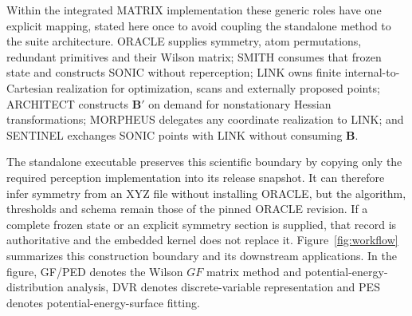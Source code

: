 \documentclass[journal=jctcce,manuscript=article,layout=traditional]{achemso}
\newcommand{\Bmat}{\mathbf{B}}
\theoremstyle{definition}
\begin{document}
Within the integrated MATRIX implementation these generic roles have one
explicit mapping, stated here once to avoid coupling the standalone method to
the suite architecture. ORACLE supplies symmetry, atom permutations, redundant
primitives and their Wilson matrix; SMITH consumes that frozen state and
constructs SONIC without reperception; LINK owns finite internal-to-Cartesian
realization for optimization, scans and externally proposed points; ARCHITECT
constructs $\Bmat'$ on demand for nonstationary Hessian transformations;
MORPHEUS delegates any coordinate realization to LINK; and SENTINEL exchanges
SONIC points with LINK without consuming $\Bmat$.

The standalone executable preserves this scientific boundary by copying only
the required perception implementation into its release snapshot.  It can
therefore infer symmetry from an XYZ file without installing ORACLE, but the
algorithm, thresholds and schema remain those of the pinned ORACLE revision.
If a complete frozen state or an explicit symmetry section is supplied, that
record is authoritative and the embedded kernel does not replace it.
Figure~\ref{fig:workflow} summarizes this construction boundary and its
downstream applications.  In the figure, GF/PED denotes the Wilson \(GF\)
matrix method and potential-energy-distribution analysis, DVR denotes
discrete-variable representation and PES denotes potential-energy-surface
fitting.
\end{document}
